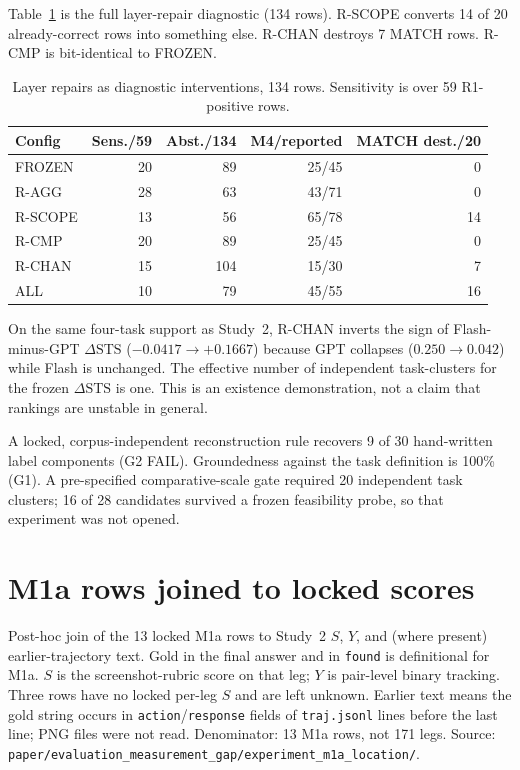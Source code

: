 \documentclass[sigconf,anonymous]{aamas}
\newcommand{\STS}{\mathrm{STS}}
\begin{document}
Table~\ref{tab:repairs-full} is the full layer-repair diagnostic (134 rows).
R-SCOPE converts 14 of 20 already-correct rows into something else.
R-CHAN destroys 7 MATCH rows.
R-CMP is bit-identical to FROZEN.

\begin{table}[H]
\centering
\caption{Layer repairs as diagnostic interventions, 134 rows. Sensitivity is over 59 R1-positive rows.}
\label{tab:repairs-full}
\footnotesize
\setlength{\tabcolsep}{4pt}
\begin{tabular}{lrrrr}
\toprule
Config & Sens./59 & Abst./134 & M4/reported & MATCH dest./20 \\
\midrule
FROZEN  & 20 &  89 & 25/45 &  0 \\
R-AGG   & 28 &  63 & 43/71 &  0 \\
R-SCOPE & 13 &  56 & 65/78 & 14 \\
R-CMP   & 20 &  89 & 25/45 &  0 \\
R-CHAN  & 15 & 104 & 15/30 &  7 \\
ALL     & 10 &  79 & 45/55 & 16 \\
\bottomrule
\end{tabular}
\end{table}

On the same four-task support as Study~2, R-CHAN inverts the sign of Flash-minus-GPT $\Delta\STS$ ($-0.0417\to +0.1667$) because GPT collapses ($0.250\to 0.042$) while Flash is unchanged.
The effective number of independent task-clusters for the frozen $\Delta\STS$ is one.
This is an existence demonstration, not a claim that rankings are unstable in general.

A locked, corpus-independent reconstruction rule recovers 9 of 30 hand-written label components (G2 FAIL).
Groundedness against the task definition is 100\% (G1).
A pre-specified comparative-scale gate required 20 independent task clusters; 16 of 28 candidates survived a frozen feasibility probe, so that experiment was not opened.

\section{M1a rows joined to locked scores}
\label{app:m1a-join}

Post-hoc join of the 13 locked M1a rows to Study~2 $S$, $Y$, and (where present) earlier-trajectory text.
Gold in the final answer and in \texttt{found} is definitional for M1a.
$S$ is the screenshot-rubric score on that leg; $Y$ is pair-level binary tracking.
Three rows have no locked per-leg $S$ and are left unknown.
Earlier text means the gold string occurs in \texttt{action}/\texttt{response} fields of \texttt{traj.jsonl} lines before the last line; PNG files were not read.
Denominator: 13 M1a rows, not 171 legs.
Source: \texttt{paper/evaluation\_measurement\_gap/experiment\_m1a\_location/}.
\end{document}
